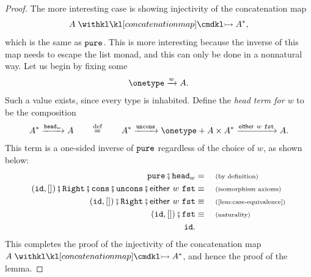 \begin{proof}
    The more interesting case is showing injectivity of the concatenation map
    \begin{align*}
        A  \concmap A^*,
    \end{align*}
    which is the same as $\mathtt{pure}$.
    This is more interesting because the inverse of this map needs to escape the list monad, and this can only be done in a nonnatural way. Let us begin by fixing some 
    \begin{align*}
        \onetype \xrightarrow w A.
    \end{align*}
    Such a value exists, since every type is inhabited. Define the \emph{head term for $w$} to be the composition
    \begin{align*}
        A^* \xrightarrow {\headterm_w} A
        \qquad \eqdef \qquad
        A^* \xrightarrow \unconsterm \onetype + A \times A^* \xrightarrow {\either w  \fstterm} A.
    \end{align*}
    This term is a one-sided inverse of $\mathtt{pure}$ regardless of the choice of $w$, as shown below:
    \begin{align*}
        \pureterm\comp \headterm_w &= \why{by definition}                                                     \\
        (\idterm, [])\comp \rightterm\comp \consterm\comp \unconsterm\comp \either w \fstterm \equalbecause{isomorphism axioms} \\
        (\idterm, [])\comp \rightterm\comp \either w \fstterm \equalbecause{\cref{lem:case-equivalence}}                \\
        (\idterm, [])\comp \fstterm \equalbecause{naturality}                                                       \\
        \idterm.
    \end{align*}
    This completes the proof of the injectivity of the concatenation map $A \concmap A^*$, and hence the proof of the lemma.
\end{proof}


